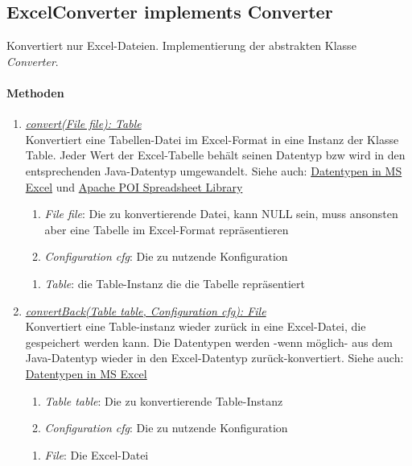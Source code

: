 \subsection{ExcelConverter implements Converter}
Konvertiert nur Excel-Dateien. Implementierung der abstrakten Klasse \textit{Converter}.\\

\paragraph{Methoden}
\begin{enumerate}[+]
	\item \underline{\textit{convert(File file): Table}} \\
	Konvertiert eine Tabellen-Datei im Excel-Format in eine Instanz der Klasse Table.
	Jeder Wert der Excel-Tabelle behält seinen Datentyp bzw wird in den entsprechenden Java-Datentyp umgewandelt.
	Siehe auch: \href{https://support.office.com/en-us/article/data-types-in-data-models-e2388f62-6122-4e2b-bcad-053e3da9ba90#__toc327893213}{Datentypen in MS Excel} und 
	\href{http://poi.apache.org/spreadsheet/}{Apache POI Spreadsheet Library}	
	\begin{enumerate}[$\bullet$]
		\item \textit{File file}: Die zu konvertierende Datei, kann NULL sein, muss ansonsten aber eine Tabelle im Excel-Format repräsentieren
		\item \textit{Configuration cfg}: Die zu nutzende Konfiguration
	\end{enumerate}
	\vspace{-0.2cm}
	\begin{enumerate}[$\circ$]
		\item \textit{Table}: die Table-Instanz die die Tabelle repräsentiert
	\end{enumerate}
	
	\item \underline{\textit{convertBack(Table table, Configuration cfg): File}} \\
	Konvertiert eine Table-instanz wieder zurück in eine Excel-Datei, die gespeichert werden kann.
	Die Datentypen werden -wenn möglich- aus dem Java-Datentyp wieder in den Excel-Datentyp zurück-konvertiert.
	Siehe auch: \href{https://support.office.com/en-us/article/data-types-in-data-models-e2388f62-6122-4e2b-bcad-053e3da9ba90#__toc327893213}{Datentypen in MS Excel}
	\begin{enumerate}[$\bullet$]
		\item \textit{Table table}: Die zu konvertierende Table-Instanz
		\item \textit{Configuration cfg}: Die zu nutzende Konfiguration
	\end{enumerate}
	\vspace{-0.2cm}
	\begin{enumerate}[$\circ$]
		\item \textit{File}: Die Excel-Datei
	\end{enumerate}
\end{enumerate}
